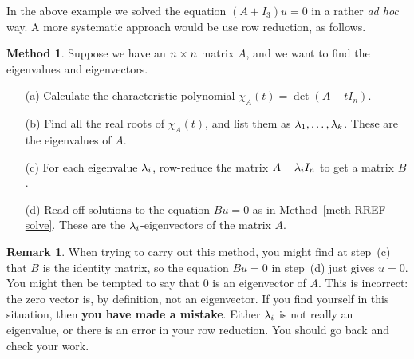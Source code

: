 \documentclass[reqno]{amsart}
\theoremstyle{definition}
\newtheorem{remark}[theorem]{Remark}
\newtheorem{method}[theorem]{Method}
\begin{document}
In the above example we solved the equation $(A+I_3)u=0$ in a rather
\emph{ad hoc} way.  A more systematic approach would be use row
reduction, as follows.
\begin{method}\label{meth-eigen}
 Suppose we have an $n\times n$ matrix $A$, and we want to find the
 eigenvalues and eigenvectors.
 \begin{itemize}
  \item[(a)] Calculate the characteristic polynomial
   $\chi_A(t)=\det(A-t I_n)$.
  \item[(b)] Find all the real roots of $\chi_A(t)$, and list them as
   $\lambda_1,\dotsc,\lambda_k$.  These are the eigenvalues of $A$.
  \item[(c)] For each eigenvalue $\lambda_i$, row-reduce the matrix
   $A-\lambda_i I_n$ to get a matrix $B$.
  \item[(d)] Read off solutions to the equation $Bu=0$ as in
   Method~\ref{meth-RREF-solve}.  These are the $\lambda_i$-eigenvectors
   of the matrix $A$.
 \end{itemize}
\end{method}

\begin{remark}\label{eg-eigenvalue-error}
 When trying to carry out this method, you might find at step~(c) that
 $B$ is the identity matrix, so the equation $Bu=0$ in step~(d) just
 gives $u=0$.  You might then be tempted to say that $0$ is an
 eigenvector of $A$.  This is incorrect: the zero vector is, by
 definition, not an eigenvector.  If you find yourself in this
 situation, then \textbf{you have made a mistake}.  Either $\lambda_i$ is
 not really an eigenvalue, or there is an error in your row
 reduction.  You should go back and check your work.
\end{remark}
\end{document}

